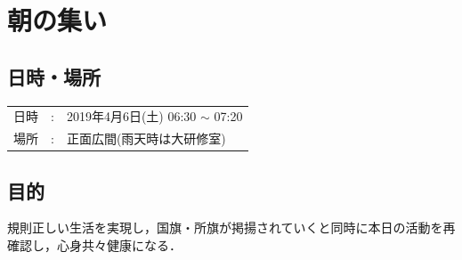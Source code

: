 %

\section{朝の集い}

\subsection{日時・場所}
\begin{tabular}{p{}rp{}}
  日時 & : & 2019年4月6日(土) 06:30 $\sim$ 07:20\\
  場所 & : & 正面広間(雨天時は大研修室)　\\
\end{tabular}

\subsection{目的}
規則正しい生活を実現し，国旗・所旗が掲揚されていくと同時に本日の活動を再確認し，心身共々健康になる．

